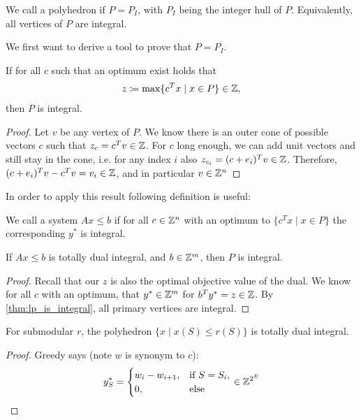 \begin{definition}
    We call a polyhedron  if $P=P_I$, with $P_I$ being the
    integer hull of $P$.
    Equivalently, all vertices of $P$ are integral.
\end{definition}
We first want to derive a tool to prove that $P = P_I$.
\begin{theorem} \label{thm:lp_is_integral}
    If for all $c$ such that an optimum exist holds that
    \begin{align*}
        z \coloneqq \max \{c^Tx \mid x \in P\} \in \mathbb{Z},
    \end{align*}
    then $P$ is integral.
\end{theorem}
\begin{proof}
    Let $v$ be any vertex of $P$. We know there is an outer cone of possible vectors $c$ such that $z_c = c^Tv \in \mathbb{Z}$.
    For $c$ long enough, we can add unit vectors and still stay in the cone,
    i.e. for any index $i$ also $z_{c_i}=(c+e_i)^Tv \in \mathbb{Z}$.
    Therefore, $(c+e_i)^Tv-c^Tv=v_i\in \mathbb{Z}$, and in particular $v \in \mathbb{Z}^n$
\end{proof}
In order to apply this result following definition is useful:
\begin{definition}
    We call a system $Ax \leq b$  if for all $c \in \mathbb{Z}^n$ with an optimum to $\{c^Tx \mid x \in P\}$
    the corresponding $y^*$ is integral.
\end{definition}
\begin{corollary}
    If $Ax \leq b$ is totally dual integral, and $b \in \mathbb{Z}^m$, then $P$ is integral.
\end{corollary}
\begin{proof}
    Recall that our $z$ is also the optimal objective value of the dual.
    We know for all $c$ with an optimum, that $y^* \in \mathbb{Z}^m$ for $b^Ty^* = z \in \mathbb{Z}$.
    By \autoref{thm:lp_is_integral}, all primary vertices are integral.
\end{proof}
\begin{theorem}
    For submodular $r$, the polyhedron $\{x \mid x(S) \leq r(S)\}$ is totally dual integral.
\end{theorem}
\begin{proof}
    Greedy says (note $w$ is synonym to $c$):
    \begin{align*}
        y_S^* = \begin{cases}
                    w_i - w_{i+1}, & \text{if } S=S_i, \\
                    0,             & \text{else}
                \end{cases} \in \mathbb{Z}^{2^E}
    \end{align*}
\end{proof}

